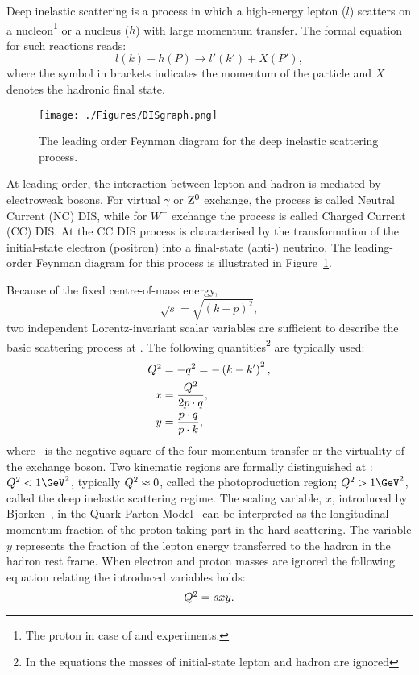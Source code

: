 Deep inelastic scattering is a process in which a high-energy lepton ($l$) scatters on a nucleon\footnote{The proton in case of \hone and \zeus experiments.} or a nucleus ($h$) with large momentum transfer. The formal equation for such reactions reads:
\[
l\left( k \right) + h\left( P \right) \rightarrow l'\left( k' \right) + X\left( P' \right),
\]
where the symbol in brackets indicates the momentum of the particle and $X$ denotes the hadronic final state.
\begin{figure}
	\centering
		\texttt{[image: ./Figures/DISgraph.png]}
	\caption{The leading order Feynman diagram for the deep inelastic scattering process.}
	\label{fig:DISgraph}
\end{figure}
At leading order, the interaction between lepton and hadron is mediated by electroweak bosons. For virtual $\gamma$ or $\mbox{$\rm{Z}^0$}$ exchange, the process is called Neutral Current (NC) DIS, while for $W^\pm$ exchange the process is called Charged Current (CC) DIS. At \hera the CC DIS process is characterised by the transformation of the initial-state electron (positron) into a final-state (anti-) neutrino. The leading-order Feynman diagram for this process is illustrated in Figure~\ref{fig:DISgraph}.

Because of the fixed centre-of-mass energy, 
\begin{equation}
\sqrt{s}=\sqrt{\left(k+p\right)^2},
\end{equation} 
two independent Lorentz-invariant scalar variables are sufficient to describe the basic scattering process at \hera. The following quantities\footnote{In the equations the masses of initial-state lepton and hadron are ignored} are typically used:
\begin{align}
\mbox{${Q^2}$} &= -q^2 = -\left( k - k' \right)^2,\\
     x &= \frac{\mbox{${Q^2}$}}{2p\cdot q},\\
		 y &= \frac{p\cdot q}{p\cdot k},
\label{eq:vardefinit}
\end{align}
where \qsq\, is the negative square of the four-momentum transfer or the virtuality of the exchange boson. Two kinematic regions are formally distinguished at \hera: $\qsq < 1\GeV^2$, typically $\mbox{${Q^2}$} \approx 0$, called the photoproduction region; $\qsq > 1 \GeV^2$, called the deep inelastic scattering regime. The scaling variable, $x$, introduced by Bjorken~\cite{Bjorken:1968dy}, in the Quark-Parton Model~\cite{Feynman:1969ej,Feynman:1973xc} can be interpreted as the longitudinal momentum fraction of the proton taking part in the hard scattering. The variable $y$ represents the fraction of the lepton energy transferred to the hadron in the hadron rest frame. When electron and proton masses are ignored the following equation relating the introduced variables holds:
\begin{equation}
\mbox{${Q^2}$} = sxy.
\label{eq:qsxy}
\end{equation}

